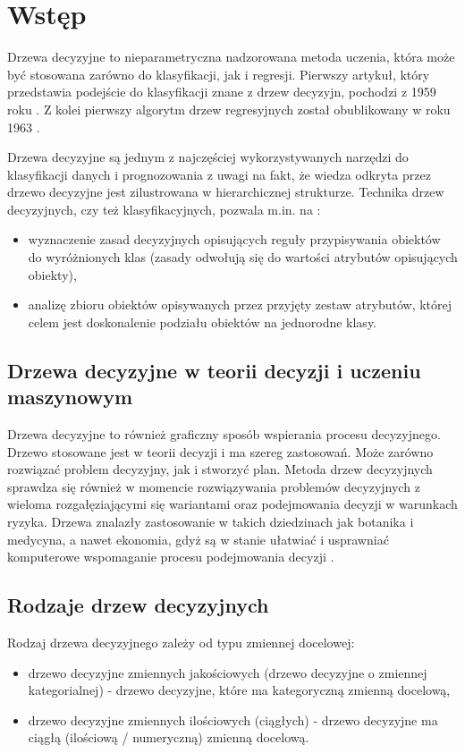 \documentclass[10pt,a4paper]{article}
\begin{document}
\tableofcontents
\newpage

\section{Wstęp}
Drzewa decyzyjne to nieparametryczna nadzorowana metoda uczenia, która może być stosowana zarówno do klasyfikacji, jak i regresji. Pierwszy artykuł, który przedstawia podejście do klasyfikacji znane z drzew decyzyjn, pochodzi z 1959 roku \cite{Belson1959}. Z kolei pierwszy algorytm drzew regresyjnych został obublikowany w roku 1963 \cite{Morgan1963}.\par
\vskip 0.2in
Drzewa decyzyjne są jednym z najczęściej wykorzystywanych narzędzi do klasyfikacji danych i prognozowania z uwagi na fakt, że wiedza odkryta przez drzewo decyzyjne jest zilustrowana w hierarchicznej strukturze. Technika drzew decyzyjnych, czy też klasyfikacyjnych, pozwala m.in. na \cite{MazumdarWWW, Quinlan1986}:
\begin{itemize}
	\item wyznaczenie zasad decyzyjnych opisujących reguły przypisywania obiektów do wyróżnionych klas (zasady odwołują się do wartości atrybutów opisujących obiekty),
	\item analizę zbioru obiektów opisywanych przez przyjęty zestaw atrybutów, której celem jest doskonalenie podziału obiektów na jednorodne klasy.
\end{itemize}

\subsection{Drzewa decyzyjne w teorii decyzji i uczeniu maszynowym}
Drzewa decyzyjne to również graficzny sposób wspierania procesu decyzyjnego. Drzewo stosowane jest w teorii decyzji i ma szereg zastosowań. Może zarówno rozwiązać problem decyzyjny, jak i stworzyć plan. Metoda drzew decyzyjnych sprawdza się również w momencie rozwiązywania problemów decyzyjnych z wieloma rozgałęziającymi się wariantami oraz podejmowania decyzji w warunkach ryzyka. Drzewa znalazły zastosowanie w takich dziedzinach jak botanika i medycyna, a nawet ekonomia, gdyż są w stanie ułatwiać i usprawniać komputerowe wspomaganie procesu podejmowania decyzji \cite{Morgan1963, Quinlan1990}.

\subsection{Rodzaje drzew decyzyjnych}
Rodzaj drzewa decyzyjnego zależy od typu zmiennej docelowej:
\begin{itemize}
	\item drzewo decyzyjne zmiennych jakościowych (drzewo decyzyjne o zmiennej kategorialnej) - drzewo decyzyjne, które ma kategoryczną zmienną docelową,
	\item drzewo decyzyjne zmiennych ilościowych (ciągłych) - drzewo decyzyjne ma ciągłą (ilościową / numeryczną) zmienną docelową.
\end{itemize}\par
\vskip 0.2in
\end{document}
